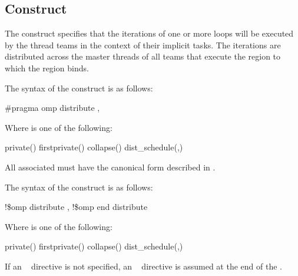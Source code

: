 \subsection{ Construct}
\label{subsec:distribute Construct}
\summary
The  construct specifies that the iterations of one or more loops will be 
executed by the thread teams in the context of their implicit tasks. The iterations are 
distributed across the master threads of all teams that execute the  region to 
which the  region binds.

\syntax
\ccppspecificstart
The syntax of the  construct is as follows:

\begin{boxedcode}
\#pragma omp distribute \plc{[clause[ [},\plc{] clause] ... ] new-line}
\end{boxedcode}

Where  is one of the following:

\begin{indentedcodelist}
private()
firstprivate()
collapse()
dist\_schedule(\plc{kind[},\plc{ chunk\_size]})
\end{indentedcodelist}

All associated  must have the canonical form described in 
.
\ccppspecificend
\bigskip

\fortranspecificstart
The syntax of the  construct is as follows:

\begin{boxedcode}
!\$omp distribute \plc{[clause[ [},\plc{] clause] ... ]}
\plc{[}!\$omp end distribute\plc{]}
\end{boxedcode}

Where  is one of the following:

\begin{indentedcodelist}
private()
firstprivate()
collapse()
dist\_schedule(\plc{kind[},\plc{ chunk\_size]})
\end{indentedcodelist}

If an ~ directive is not specified, an ~ directive 
is assumed at the end of the .

